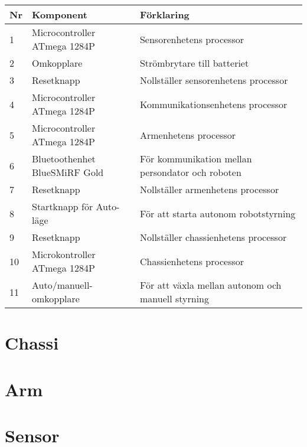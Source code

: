 \documentclass[a4paper,12pt]{article}
\begin{document}

\begin{center}
    \begin{tabular}{| l | l | l |}
    \hline
   \textbf{Nr} &  \textbf{Komponent} &  \textbf{Förklaring} \\ \hline
    1 & Microcontroller ATmega 1284P & Sensorenhetens processor \\ \hline
 2 & Omkopplare & Strömbrytare till batteriet \\ \hline
 3 & Resetknapp & Nollställer sensorenhetens processor \\ \hline
 4 & Microcontroller ATmega 1284P & Kommunikationsenhetens processor \\ \hline
 5 & Microcontroller ATmega 1284P & Armenhetens processor \\ \hline
 6 & Bluetoothenhet BlueSMiRF Gold &  För kommunikation mellan persondator och roboten\\ \hline
 7 & Resetknapp & Nollställer armenhetens processor \\ \hline
 8 & Startknapp för Auto-läge & För att starta autonom robotstyrning \\ \hline
9 & Resetknapp & Nollställer chassienhetens processor \\ \hline
10 & Microkontroller ATmega 1284P & Chassienhetens processor \\ \hline
11 & Auto/manuell-omkopplare & För att växla mellan autonom och manuell styrning \\ \hline
    \end{tabular}
\end{center}

\section{Chassi}

\section{Arm}

\section{Sensor}
\end{document}
